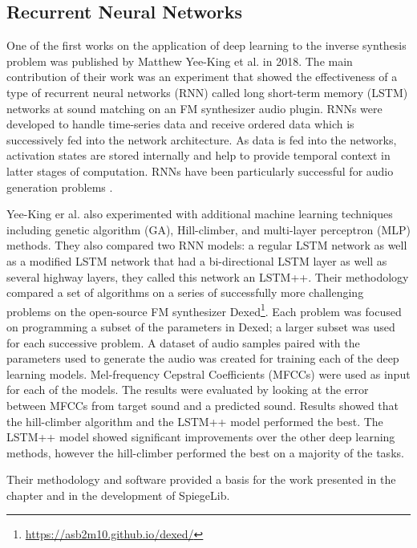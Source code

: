 \subsection{Recurrent Neural Networks}
One of the first works on the application of deep learning to the inverse synthesis problem was published by Matthew Yee-King et al. \cite{yee2018automatic} in 2018. The main contribution of their work was an experiment that showed the effectiveness of a type of recurrent neural networks (RNN) called long short-term memory (LSTM) networks at sound matching on an FM synthesizer audio plugin. RNNs were developed to handle time-series data and receive ordered data which is successively fed into the network architecture. As data is fed into the networks, activation states are stored internally and help to provide temporal context in latter stages of computation. RNNs have been particularly successful for audio generation problems \cite{oord2016wavenet, engel2017neural}. 

Yee-King er al. also experimented with additional machine learning techniques including genetic algorithm (GA), Hill-climber, and  multi-layer perceptron (MLP) methods. They also compared two RNN models: a regular LSTM network as well as a modified LSTM network that had a bi-directional LSTM layer as well as several highway layers, they called this network an LSTM++. Their methodology compared a set of algorithms on a series of successfully more challenging problems on the open-source FM synthesizer Dexed\footnote{\url{https://asb2m10.github.io/dexed/}}. Each problem was focused on programming a subset of the parameters in Dexed; a larger subset was used for each successive problem. A dataset of audio samples paired with the parameters used to generate the audio was created for training each of the deep learning models. Mel-frequency Cepstral Coefficients (MFCCs) were used as input for each of the models. The results were evaluated by looking at the error between MFCCs from target sound and a predicted sound. Results showed that the hill-climber algorithm and the LSTM++ model performed the best. The LSTM++ model showed significant improvements over the other deep learning methods, however the hill-climber performed the best on a majority of the tasks.


Their methodology and software provided a basis for the work presented in the chapter and in the development of SpiegeLib.



